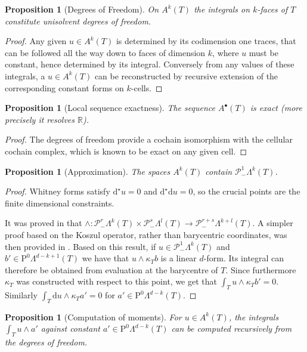 \documentclass[10pt,a4paper]{article}
\newcommand{\rmd}{\mathrm{d}}
\newcommand{\rmP}{\mathrm{P}}
\newcommand{\bbR}{\mathbb{R}}
\newcommand{\calP}{\mathcal{P}}
\newcommand{\bs}{{\scriptscriptstyle{\bullet}}}
\newcommand{\Poly}{\calP}
\newcommand{\Pminus}{\Poly_{\!\!-}}
\newtheorem{proposition}[theorem]{Proposition}
\theoremstyle{remark}
\theoremstyle{definition}
\numberwithin{equation}{section}
\begin{document}
\begin{proposition}[Degrees of Freedom]
On $A^k(T)$ the integrals on $k$-faces of $T$ constitute unisolvent degrees of freedom.
\end{proposition}
\begin{proof}
Any given $u \in A^k(T)$ is determined by its codimension one traces, that can be followed all the way down to faces of dimension $k$, where $u$ must be constant, hence determined by its integral. Conversely from any values of these integrals, a $u \in A^k(T)$ can be reconstructed by recursive extension of the corresponding constant forms on $k$-cells.
\end{proof}

\begin{proposition}[Local sequence exactness]
The sequence $A^\bs(T)$ is exact (more precisely it resolves $\bbR$).
  \end{proposition}
\begin{proof}
  The degrees of freedom provide a cochain isomorphism with the cellular cochain complex, which is known to be exact on any given cell.
\end{proof}

\begin{proposition}[Approximation]
  The spaces $A^k(T)$ contain $\Pminus^1 \Lambda^k(T)$.
\end{proposition}

\begin{proof}
Whitney forms satisfy $\rmd^\star u = 0$ and $\rmd^\star \rmd u = 0$, so the crucial points are the finite dimensional constraints.

  It was proved in \cite[Preprint, Proposition 3.9]{Chr07NM} that $\wedge : \Pminus^r \Lambda^k(T) \times \Pminus^s \Lambda^l(T) \to \Pminus^{r+s}\Lambda^{k+l}(T)$. A simpler proof based on the Koszul operator, rather than barycentric coordinates, was then provided in \cite[Equation (3.16)]{ArnFalWin06}. Based on this result, if $u\in \Pminus^1 \Lambda ^k(T)$ and $b' \in \rmP^0 \Lambda^{d-k+1}(T)$ we have that $u \wedge \kappa_T b$ is a linear $d$-form. Its integral can therefore be obtained from evaluation at the barycentre of $T$. Since furthermore $\kappa_T$ was constructed with respect to this point, we get that $\int_T u \wedge \kappa_T b' = 0$. Similarly $\int_T \rmd u \wedge \kappa_T a' = 0$ for $a' \in \rmP^0 \Lambda^{d-k}(T)$. 
\end{proof}

\begin{proposition}[Computation of moments]\label{prop:momconst}
For $u \in A^k(T)$, the integrals $\int_T u \wedge a'$ against constant $a' \in \rmP^0 \Lambda^{d-k} (T)$ can be computed recursively from the degrees of freedom.
\end{proposition}
\end{document}
